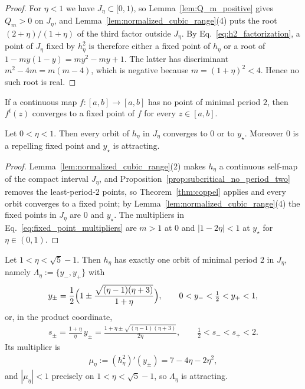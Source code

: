 \documentclass{article}
\begin{document}
\begin{proof}
For $\eta<1$ we have $J_\eta\subset[0,1)$, so
Lemma~\ref{lem:Q_m_positive} gives $Q_m>0$ on $J_\eta$, and
Lemma~\ref{lem:normalized_cubic_range}(4) puts the root $(2+\eta)/(1+\eta)$ of
the third factor outside $J_\eta$. By Eq.~\eqref{eq:h2_factorization}, a point
of $J_\eta$ fixed by $h_\eta^2$ is therefore either a fixed point of $h_\eta$
or a root of $1-my(1-y)=my^2-my+1$. The latter has discriminant
$m^2-4m=m(m-4)$, which is negative because $m=(1+\eta)^2<4$. Hence no such
root is real.
\end{proof}

\begin{theorem}
\label{thm:coppel}
If a continuous map $f\colon[a,b]\to[a,b]$ has no point of minimal period $2$,
then $f^t(z)$ converges to a fixed point of $f$ for every $z\in[a,b]$.
\end{theorem}

\begin{corollary}
\label{cor:subcritical_reduced_convergence}
Let $0<\eta<1$. Then every orbit of $h_\eta$ in $J_\eta$ converges to $0$ or to
$y_\star$. Moreover $0$ is a repelling fixed point and $y_\star$ is attracting.
\end{corollary}

\begin{proof}
Lemma~\ref{lem:normalized_cubic_range}(2) makes $h_\eta$ a continuous self-map
of the compact interval $J_\eta$, and
Proposition~\ref{prop:subcritical_no_period_two} removes the least-period-$2$
points, so Theorem~\ref{thm:coppel} applies and every orbit converges to a
fixed point; by Lemma~\ref{lem:normalized_cubic_range}(4) the fixed points in
$J_\eta$ are $0$ and $y_\star$. The multipliers in
Eq.~\eqref{eq:fixed_point_multipliers} are $m>1$ at $0$ and $|1-2\eta|<1$ at
$y_\star$ for $\eta\in(0,1)$.
\end{proof}

\begin{proposition}
\label{prop:postcritical_unique_period_two}
Let $1<\eta<\sqrt5-1$. Then $h_\eta$ has exactly one orbit of minimal period $2$
in $J_\eta$, namely $\Lambda_\eta:=\{y_-,y_+\}$ with
\begin{align}
    y_\pm
    =
    \frac12
    \Bigl(
    1\pm\frac{\sqrt{(\eta-1)(\eta+3)}}{1+\eta}
    \Bigr),
    \qquad
    0<y_-<\tfrac12<y_+<1 ,
    \label{eq:y_pm}
\end{align}
or, in the product coordinate,
\begin{align}
    s_\pm=\frac{1+\eta}{\eta}\,y_\pm
    =\frac{1+\eta\pm\sqrt{(\eta-1)(\eta+3)}}{2\eta},
    \qquad
    \tfrac12<s_-<s_+<2 .
    \label{eq:s_pm}
\end{align}
Its multiplier is
\begin{align}
    \mu_\eta:=(h_\eta^2)'(y_\pm)=7-4\eta-2\eta^2,
    \label{eq:two_cycle_multiplier}
\end{align}
and $|\mu_\eta|<1$ precisely on $1<\eta<\sqrt5-1$, so $\Lambda_\eta$ is
attracting.
\end{proposition}
\end{document}
